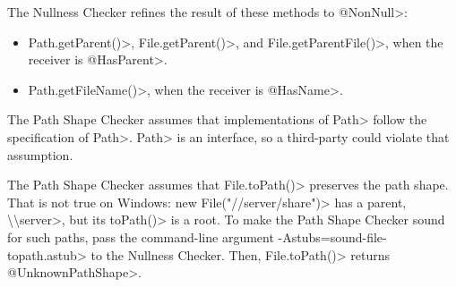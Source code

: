 
The Nullness Checker refines the result of these methods to \<@NonNull>:

\begin{itemize}
\item
  \<Path.getParent()>, \<File.getParent()>, and \<File.getParentFile()>,
  when the receiver is \<@HasParent>.
\item
  \<Path.getFileName()>, when the receiver is \<@HasName>.
\end{itemize}



The Path Shape Checker assumes that implementations of \<Path> follow the
specification of \<Path>.  \<Path> is an interface, so a third-party
could violate that assumption.

The Path Shape Checker assumes that \<File.toPath()> preserves the path
shape.  That is not true on Windows:  \<new File("//server/share")> has a
parent, \<\textbackslash{}\textbackslash{}server>, but its \<toPath()> is a
root.  To make the Path Shape Checker sound for such paths, pass the
command-line argument \<-Astubs=sound-file-topath.astub> to the Nullness
Checker.  Then, \<File.toPath()> returns \<@UnknownPathShape>.

